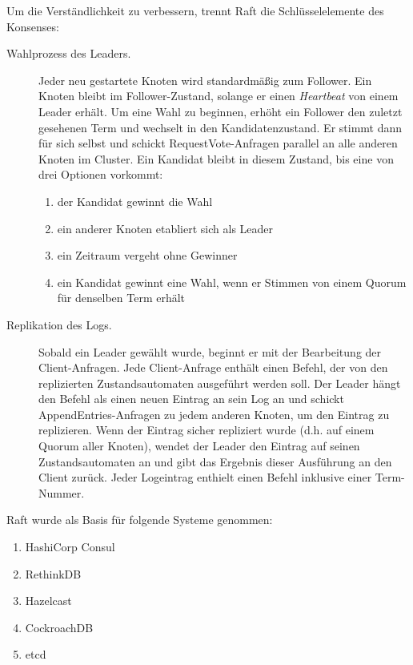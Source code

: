 Um die Verständlichkeit zu verbessern, trennt Raft die Schlüsselelemente des Konsenses:

\begin{description} 
	\item[Wahlprozess des Leaders.] Jeder neu gestartete Knoten wird standardmäßig zum Follower. Ein Knoten bleibt im Follower-Zustand, solange er einen \textit{Heartbeat} von einem Leader erhält. Um eine Wahl zu beginnen, erhöht ein Follower den zuletzt gesehenen Term und wechselt in den Kandidatenzustand. Er stimmt dann für sich selbst und schickt RequestVote-Anfragen parallel an alle anderen Knoten im Cluster. Ein Kandidat bleibt in diesem Zustand, bis eine von drei Optionen vorkommt:
	
	\begin{enumerate}
		\item der Kandidat gewinnt die Wahl
		
		\item ein anderer Knoten etabliert sich als Leader
		
		\item ein Zeitraum vergeht ohne Gewinner
		
		\item ein Kandidat gewinnt eine Wahl, wenn er Stimmen von einem Quorum für denselben Term erhält
	\end{enumerate}
	
	\item[Replikation des Logs.] Sobald ein Leader gewählt wurde, beginnt er mit der Bearbeitung der Client-Anfragen. Jede Client-Anfrage enthält einen Befehl, der von den replizierten Zustandsautomaten ausgeführt werden soll. Der Leader hängt den Befehl als einen neuen Eintrag an sein Log an und schickt AppendEntries-Anfragen zu jedem anderen Knoten, um den Eintrag zu replizieren. Wenn der Eintrag sicher repliziert wurde (d.h. auf einem Quorum aller Knoten), wendet der Leader den Eintrag auf seinen Zustandsautomaten an und gibt das Ergebnis dieser Ausführung an den Client zurück. Jeder Logeintrag enthielt einen Befehl inklusive einer Term-Nummer.
\end{description}

Raft wurde als Basis für folgende Systeme genommen:

\begin{enumerate}
	\item HashiCorp Consul
	
	\item RethinkDB
	
	\item Hazelcast
	
	\item CockroachDB
	
	\item etcd
\end{enumerate}

